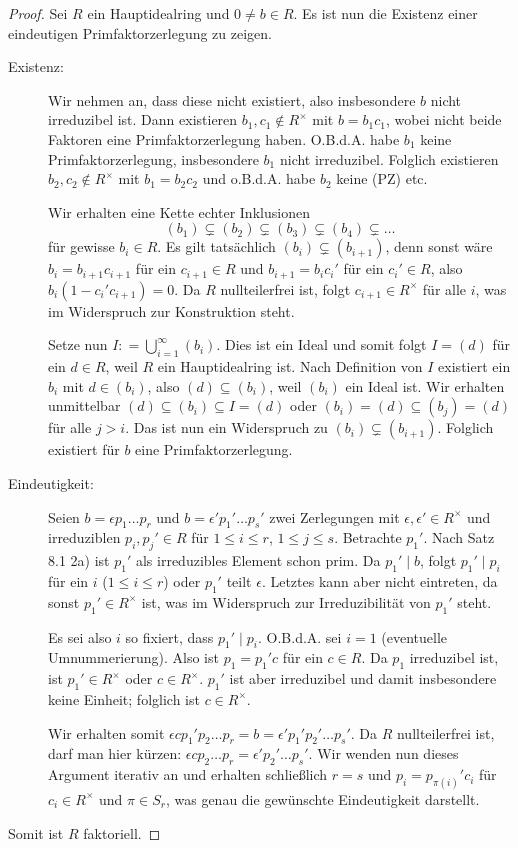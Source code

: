 \documentclass[12pt,a4paper]{scrartcl}
\begin{document}
\begin{proof} Sei $R$ ein Hauptidealring und $0\neq b\in R$. Es ist nun die Existenz einer eindeutigen Primfaktorzerlegung zu zeigen.
\begin{description}
	\item[Existenz:] Wir nehmen an, dass diese nicht existiert, also insbesondere $b$ nicht irreduzibel ist. Dann existieren $b_1,c_1\notin R^{\times}$ mit $b = b_1c_1$, wobei nicht beide Faktoren eine Primfaktorzerlegung haben. O.B.d.A. habe $b_1$ keine Primfaktorzerlegung, insbesondere $b_1$ nicht irreduzibel. Folglich existieren $b_2,c_2\notin R^{\times}$ mit $b_1 = b_2c_2$ und o.B.d.A. habe $b_2$ keine (PZ) etc.
	
	Wir erhalten eine Kette echter Inklusionen
	\[(b_1)\subsetneq (b_2)\subsetneq (b_3)\subsetneq (b_4)\subsetneq \dots\] für gewisse $b_i\in R$. Es gilt tatsächlich $(b_i) \subsetneq (b_{i+1})$, denn sonst wäre $b_i = b_{i+1}c_{i+1}$ für ein $c_{i+1}\in R$ und $b_{i+1} = b_ic_i'$ für ein $c_i'\in R$, also $b_i(1-c_i'c_{i+1}) = 0$. Da $R$ nullteilerfrei ist, folgt $c_{i+1}\in R^{\times}$ für alle $i$, was im Widerspruch zur Konstruktion steht.
	
	Setze nun $I : = \bigcup\limits_{i = 1}^{\infty}(b_i)$. Dies ist ein Ideal und somit folgt $I = (d)$ für ein $d\in R$, weil $R$ ein Hauptidealring ist. Nach Definition von $I$ existiert ein $b_i$ mit $d\in (b_i)$, also $(d)\subseteq (b_i)$, weil $(b_i)$ ein Ideal ist. Wir erhalten unmittelbar $(d) \subseteq (b_i)\subseteq I = (d)$ oder $(b_i) = (d)\subseteq (b_j) = (d)$ für alle $j>i$. Das ist nun ein Widerspruch zu $(b_i) \subsetneq (b_{i+1})$. Folglich existiert für $b$ eine Primfaktorzerlegung.
	\item[Eindeutigkeit:] Seien $b = \epsilon p_1\dots p_r$ und $b = \epsilon'p_1'\dots p_s'$ zwei Zerlegungen mit $\epsilon, \epsilon'\in R^{\times}$ und irreduziblen $p_i, p_j'\in R$ für $1\leq i\leq r$, $1\leq j\leq s$. Betrachte $p_1'$. Nach Satz 8.1 2a) ist $p_1'$ als irreduzibles Element schon prim. Da $p_1'\mid b$, folgt $p_1'\mid p_i$ für ein $i$ ($1\leq i\leq r$) oder $p_1'$ teilt $\epsilon$. Letztes kann aber nicht eintreten, da sonst $p_1'\in R^{\times}$ ist, was im Widerspruch zur Irreduzibilität von $p_1'$ steht.
	
	Es sei also $i$ so fixiert, dass $p_1' \mid p_i$. O.B.d.A. sei $i = 1$ (eventuelle Umnummerierung). Also ist $p_1 = p_1'c$ für ein $c\in R$. Da $p_1$ irreduzibel ist, ist $p_1'\in R^{\times}$ oder $c\in R^{\times}$. $p_1'$ ist aber irreduzibel und damit insbesondere keine Einheit; folglich ist $c\in R^{\times}$.
	
	Wir erhalten somit $\epsilon cp_1'p_2\dots p_r = b = \epsilon 'p_1'p_2'\dots p_s'$. Da $R$ nullteilerfrei ist, darf man hier kürzen: $\epsilon c p_2\dots p_r = \epsilon 'p_2'\dots p_s'$. Wir wenden nun dieses Argument iterativ an und erhalten schließlich $r = s$ und $p_i = p_{\pi(i)}'c_i$ für $c_i\in R^{\times}$ und $\pi\in S_r$, was genau die gewünschte Eindeutigkeit darstellt.
\end{description}
Somit ist $R$ faktoriell.
\end{proof}
\end{document}
